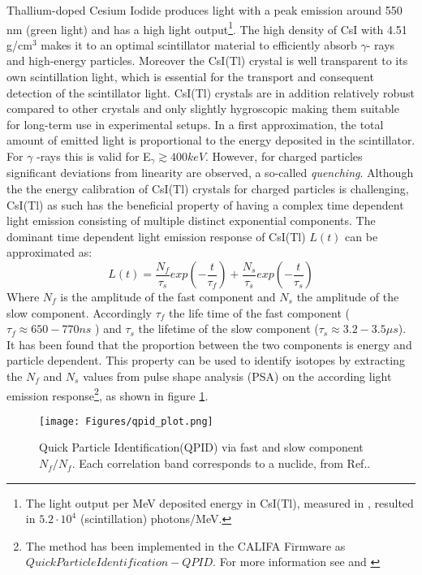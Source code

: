 Thallium-doped Cesium Iodide produces light with a peak emission around 550 nm (green light) and has a high light output\footnote{The light output per MeV deposited energy in CsI(Tl), measured in \cite{holl1988measurement}, resulted in  $5.2\cdot10^{4}$ (scintillation) photons/MeV.}. The high density of CsI with 4.51 g/cm$^3$ makes it to an optimal scintillator material to efficiently absorb $\gamma$- rays and high-energy particles. Moreover the CsI(Tl) crystal is well transparent to its own scintillation light, which is essential for the transport and consequent  detection of the scintillator light. CsI(Tl) crystals are in addition relatively robust compared to other crystals and only slightly hygroscopic making them suitable for long-term use in experimental setups.\newline
In a first approximation, the total amount of emitted light is proportional to the energy deposited in the scintillator. For $\gamma$ -rays this is valid for E$_{\gamma} \gtrsim 400 keV$\cite{syntfeld2007non}. However, for charged particles significant deviations from linearity are observed, a so-called \textit{quenching}\cite{murray1961scintillation}.\newline
Although the the energy calibration of CsI(Tl) crystals for charged particles is challenging, CsI(Tl) as such  has the beneficial property of having a complex time dependent light emission consisting of multiple distinct exponential components. The dominant time dependent light emission response of CsI(Tl) $L(t)$ can be approximated as:
\begin{equation}
L(t) = \frac{N_f}{\tau_s} exp(-\frac{t}{\tau_f}) + \frac{N_s}{\tau_s} exp(-\frac{t}{\tau_s})
\end{equation}
Where $N_{f}$ is the amplitude of the fast component and $N_{s}$ the amplitude of the slow component. Accordingly $\tau_{f}$ the life time of the fast component ($\tau_{f} \approx 650-770 ns$ ) and $\tau_{s}$ the lifetime of the slow component ($\tau_{s} \approx 3.2 - 3.5\mu s$). It has been found that the proportion between the two components is energy and particle dependent. This property can be used to identify isotopes by extracting the $N_{f}$ and $N_{s}$ values from pulse shape analysis (PSA) on the according light emission response\footnote{The method has been implemented in the CALIFA Firmware as $Quick Particle Identification -QPID$. For more information see \cite{winkel2011implementierung} and \cite{winkel2016komplexe}}, as shown in figure \ref{fig:qpid_califa}.\newline  
\begin{figure}[htpb]
    \centering
    \texttt{[image: Figures/qpid\_plot.png]}
    \caption{
    Quick Particle Identification(QPID) via fast and slow component $N_{f} / N_{f}$. Each correlation band corresponds to a nuclide, from Ref.\cite{winkel2016komplexe}.
    }
    \label{fig:qpid_califa}
\end{figure}

